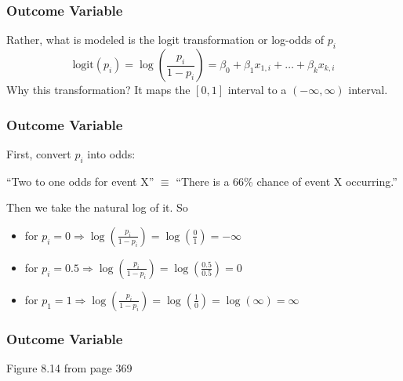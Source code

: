 \documentclass[handout]{beamer}
\newcommand{\blue}[1]{\textcolor{blue2}{#1}}
\begin{document}
\begin{frame}[fragile]
\frametitle{Outcome Variable}

%
%
Rather, what is modeled is the \blue{logit transformation} or \blue{log-odds} of $p_i$
\[
\mbox{logit}(p_i) = \log\left(
\frac{p_i}{1-p_i}
\right) = \beta_0 + \beta_1 x_{1,i} + \ldots + \beta_k x_{k,i}
\]
\pause
Why this transformation?  It maps the $[0,1]$ interval to a $(-\infty, \infty)$ interval.  

\end{frame}


\begin{frame}[fragile]
\frametitle{Outcome Variable}

%
%
First, convert $p_i$ into odds:

\vspace{0.25cm}

``Two to one odds for event X'' $\equiv$ ``There is a 66\% chance of event X occurring.''

\pause \vspace{0.25cm}


Then we take the natural log of it.  So
\begin{itemize}
\pause\item for $p_i=0 \Rightarrow \log\left(\frac{p_i}{1-p_i}\right) = \log\left(\frac{0}{1}\right) = -\infty$
\pause\item for $p_i=0.5 \Rightarrow \log\left(\frac{p_i}{1-p_i}\right) = \log\left(\frac{0.5}{0.5}\right) = 0$
\pause\item for $p_1=1  \Rightarrow \log\left(\frac{p_i}{1-p_i}\right) = \log\left(\frac{1}{0}\right) = \log(\infty) = \infty$
\end{itemize}

\end{frame}


\begin{frame}[fragile]
\frametitle{Outcome Variable}
Figure 8.14 from page 369

\vspace{6cm}

\end{frame}
\end{document}

